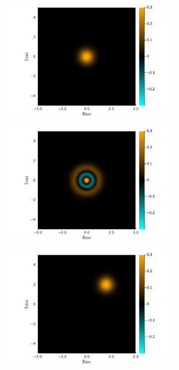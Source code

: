 \documentclass[hyperref, a4paper]{article}
\begin{document}
\begin{figure}
    \centering
    \begin{subfigure}{0.45\textwidth}
        \centering
        \includegraphics[width=\textwidth]{heatmaps/coherent-state.pdf}
        \subcaption{}
    \end{subfigure}
    \begin{subfigure}{0.45\textwidth}
        \centering
        \includegraphics[width=\textwidth]{heatmaps/fock-state.pdf}
        \subcaption{}
    \end{subfigure}
    \begin{subfigure}{0.45\textwidth}
        \centering
        \includegraphics[width=\textwidth]{heatmaps/coherent-state2.pdf}

\end{subfigure}
\end{figure}
\end{document}
